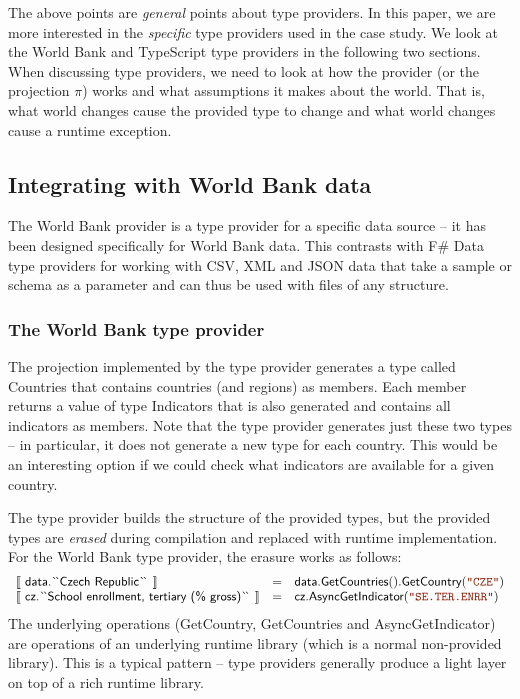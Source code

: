 \documentclass[submission,copyright,creativecommons]{eptcs}
\newcommand{\sem}[1]{\llbracket #1 \rrbracket}
\newcommand{\str}[1]{\textnormal{\textcolor{strclr}{\ttfamily "#1"}}}
\newcommand{\ident}[1]{\textnormal{\sffamily #1}}
\newcommand{\lident}[1]{\textnormal{\sffamily
  \`{}\hspace{-0.25em}\`{}\hspace{-0.1em}#1\`{}\hspace{-0.25em}\`{}}}
\begin{document}
\noindent
The above points are \emph{general} points about type providers. In this paper, we are more interested
in the \emph{specific} type providers used in the case study. We look at the World Bank and TypeScript
type providers in the following two sections. When discussing type providers, we need to look at
how the provider (or the projection $\pi$) works and what assumptions it makes about the world.
That is, what world changes cause the provided type to change and what world changes cause a
runtime exception.


\subsection{Integrating with World Bank data}
\label{sec:tp-data}

The World Bank provider \cite{fsharp-data} is a type provider for a specific data source -- it has
been designed specifically for World Bank data. This contrasts with F\# Data type providers for
working with CSV, XML and JSON data that take a sample or schema as a parameter and can thus be used
with files of any structure.

\subsubsection{The World Bank type provider}

The projection implemented by the type provider generates a type called \ident{Countries} that contains
countries (and regions) as members. Each member returns a value of type \ident{Indicators} that is
also generated and contains all indicators as members. Note that the type provider generates just
these two types -- in particular, it does not generate a new type for each country. This would be an
interesting option if we could check what indicators are available for a given country.

The type provider builds the structure of the provided types, but the provided types are \emph{erased}
during compilation and replaced with runtime implementation. For the World Bank type provider, the
erasure works as follows:
%
\begin{equation*}
\begin{array}{lcl}
 \sem{~\ident{data.}\lident{Czech Republic}~} &=&
   \ident{data.GetCountries}().\ident{GetCountry}(\str{CZE}) \\
 \sem{~\ident{cz.}\lident{School enrollment, tertiary (\% gross)}~} &=&
   \ident{cz.AsyncGetIndicator}(\str{SE.TER.ENRR})
\end{array}
\end{equation*}
%
The underlying operations (\ident{GetCountry}, \ident{GetCountries} and \ident{AsyncGetIndicator})
are operations of an underlying runtime library (which is a normal non-provided library). This is
a typical pattern -- type providers generally produce a light layer on top of a rich runtime library.
\end{document}
